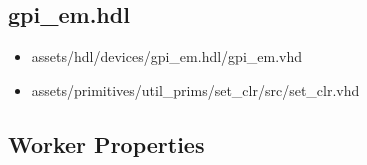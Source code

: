 \subsection*{gpi\_em.hdl}
	\begin{itemize}
		\item assets/hdl/devices/gpi\_em.hdl/gpi\_em.vhd
		\item assets/primitives/util\_prims/set\_clr/src/set\_clr.vhd
	\end{itemize}
	
\begin{landscape}
\section*{Worker Properties}

\begin{flushleft}


\end{flushleft}
\end{landscape}
